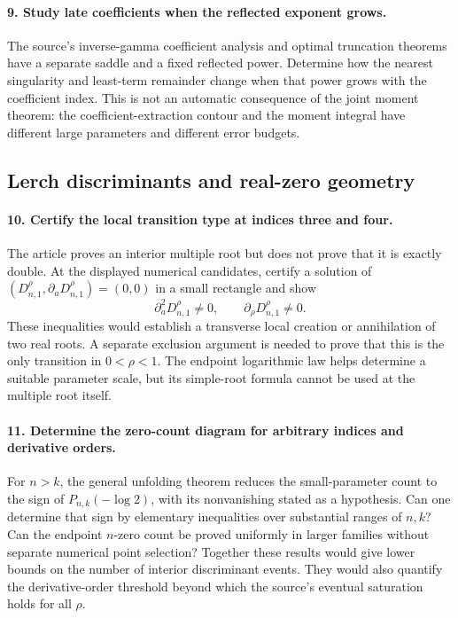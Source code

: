 \paragraph{9. Study late coefficients when the reflected exponent
grows.}
The source's inverse-gamma coefficient analysis and optimal
truncation theorems have a separate saddle and a fixed reflected
power. Determine how the nearest singularity and least-term
remainder change when that power grows with the coefficient index.
This is not an automatic consequence of the joint moment theorem:
the coefficient-extraction contour and the moment integral have
different large parameters and different error budgets.

\subsection{Lerch discriminants and real-zero geometry}

\paragraph{10. Certify the local transition type at indices three and
four.}
The article proves an interior multiple root but does not prove
that it is exactly double. At the displayed numerical candidates,
certify a solution of
$(D_{n,1}^{\rho},\partial_aD_{n,1}^{\rho})=(0,0)$ in a small
rectangle and show
\[
 \partial_a^2D_{n,1}^{\rho}\ne0,\qquad
 \partial_\rho D_{n,1}^{\rho}\ne0.
\]
These inequalities would establish a transverse local creation or
annihilation of two real roots. A separate exclusion argument is
needed to prove that this is the only transition in $0<\rho<1$.
The endpoint logarithmic law helps determine a suitable parameter
scale, but its simple-root formula cannot be used at the multiple
root itself.

\paragraph{11. Determine the zero-count diagram for arbitrary
indices and derivative orders.}
For $n>k$, the general unfolding theorem reduces the small-parameter
count to the sign of $P_{n,k}(-\log2)$, with its nonvanishing stated
as a hypothesis. Can one determine that sign by elementary
inequalities over substantial ranges of $n,k$?
Can the endpoint $n$-zero count be proved uniformly in larger
families without separate numerical point selection?
Together these results would give lower bounds on the number of
interior discriminant events. They would also quantify the
derivative-order threshold beyond which the source's eventual
saturation holds for all $\rho$.

